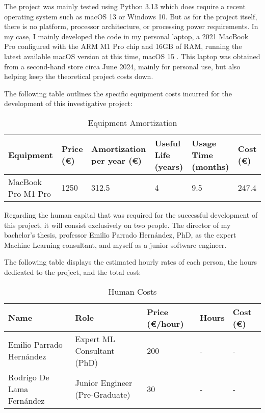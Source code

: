 \documentclass[12pt]{report} %
\begin{document}
The project was mainly tested using Python 3.13 \cite{python3.13} which does require a recent operating system such as macOS 13 or Windows 10. But as for the project itself, there is no platform, processor architecture, or processing power requirements. In my case, I mainly developed the code in my personal laptop, a 2021 MacBook Pro configured with the ARM M1 Pro chip and 16GB of RAM, running the latest available macOS version at this time, macOS 15 \cite{macos}. This laptop was obtained from a second-hand store circa June 2024, mainly for personal use, but also helping keep the theoretical project costs down.

The following table outlines the specific equipment costs incurred for the development of this investigative project:
\begin{table}[H]
	\caption{Equipment Amortization}
	\centering
	\begin{tabular}{|P{2.8cm}|P{1.8cm}|P{2.5cm}|P{1.5cm}|P{2cm}|P{1.5cm}|}
		\hline
		\textbf{Equipment} & \textbf{Price (€)} & \textbf{Amortization per year (€)} & \textbf{Useful Life (years)} & \textbf{Usage Time (months)} & \textbf{Cost (€)} \\
		\hline
		MacBook Pro M1 Pro & 1250 & 312.5 & 4 & 9.5 & 247.4 \\
		\hline
	\end{tabular}
\end{table}

Regarding the human capital that was required for the successful development of this project, it will consist exclusively on two people. The director of my bachelor's thesis, professor Emilio Parrado Hernández, PhD, as the expert Machine Learning consultant, and myself as a junior software engineer.

The following table displays the estimated hourly rates of each person, the hours dedicated to the project, and the total cost:
            
\begin{table}[H]
	\caption{Human Costs}
	\centering
	\begin{tabular}{|P{4cm}|P{3.5cm}|P{1.8cm}|P{1.5cm}|P{1.5cm}|}
		\hline
		\textbf{Name} & \textbf{Role} & \textbf{Price (€/hour)} & \textbf{Hours} & \textbf{Cost (€)} \\
		\hline
		Emilio Parrado Hernández & Expert ML Consultant (PhD) & 200 & - & - \\
		\hline
		Rodrigo De Lama Fernández & Junior Engineer (Pre-Graduate) & 30 & - & - \\
		\hline
	\end{tabular}
\end{table}
\end{document}
